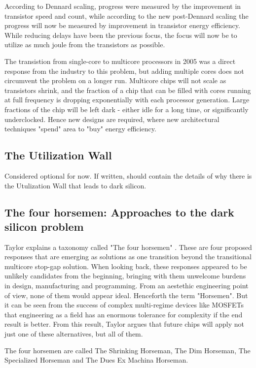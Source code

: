 According to Dennard scaling, progress were measured by the improvement in transistor speed and count, while according to the new post-Dennard scaling the progress will now be measured by improvement in transistor energy efficiency.
While reducing delays have been the previous focus, the focus will now be to utilize as much joule from the transistors as possible.

The transistion from single-core to multicore processors in 2005 was a direct response from the industry to this problem, but adding multiple cores does not circumvent the problem on a longer run.
Multicore chips will not scale as transistors shrink, and the fraction of a chip that can be filled with cores running at full frequency is dropping exponentially with each processor generation. 
Large fractions of the chip will be left dark - either idle for a long time, or significantly underclocked.
Hence new designs are required, where new architectural techniques "spend" area to "buy" energy efficiency.

\subsection{The Utilization Wall}
Considered optional for now.
If written, should contain the details of why there is the Utulization Wall that leads to dark silicon. 

\subsection{The four horsemen: Approaches to the dark silicon problem}
Taylor explains a taxonomy called "The four horsemen" \cite{dark-silicon}.
These are four proposed responses that are emerging as solutions as one transition beyond the transitional multicore stop-gap solution. \cite{dark-silicon2}
When looking back, these responses appeared to be unlikely candidates from the beginning, bringing with them unwelcome burdens in design, manufacturing and programming.
From an aestethic engineering point of view, none of them would appear ideal.
Henceforth the term "Horsemen".
But it can be seen from the success of complex multi-regime devices like MOSFETs that engineering as a field has an enormous tolerance for complexity if the end result is better.
From this result, Taylor argues that future chips will apply not just one of these alternatives, but all of them.

The four horsemen are called The Shrinking Horseman, The Dim Horseman, The Specialized Horseman and The Dues Ex Machina Horseman.

